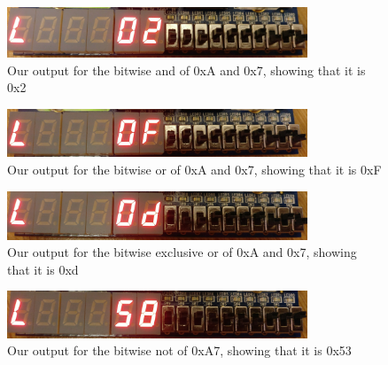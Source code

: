 \documentclass[11pt]{article}
\begin{document}
\begin{figure}[H]
    \centering
    \includegraphics[width=0.8\textwidth]{L1}
    \caption{Our output for the bitwise and of 0xA and 0x7, showing that it is 0x2}
\end{figure}
\begin{figure}[H]
    \centering
    \includegraphics[width=0.8\textwidth]{L2}
    \caption{Our output for the bitwise or of 0xA and 0x7, showing that it is 0xF}
\end{figure}
\begin{figure}[H]
    \centering
    \includegraphics[width=0.8\textwidth]{L3}
    \caption{Our output for the bitwise exclusive or of 0xA and 0x7, showing that it is 0xd}
\end{figure}
\begin{figure}[H]
    \centering
    \includegraphics[width=0.8\textwidth]{L4}
    \caption{Our output for the bitwise not of 0xA7, showing that it is 0x53}
\end{figure}
\end{document}
